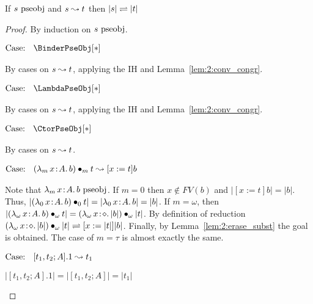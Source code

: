 \begin{lemma}
    \label{lem:2:erase_pseobj_red}
    If $s~\textnormal{pseobj}$ and $s \leadsto t$ then $|s| \rightleftharpoons |t|$
\end{lemma}
\begin{proof}
    By induction on $s~\textnormal{pseobj}$.

    $\text{Case: }\begin{array}{c} \BinderPseObj[*] \end{array}$
    \begin{proofcase}
        By cases on $s \leadsto t$, applying the IH and Lemma~\ref{lem:2:conv_congr}.
    \end{proofcase}

    $\text{Case: }\begin{array}{c} \LambdaPseObj[*] \end{array}$
    \begin{proofcase}
        By cases on $s \leadsto t$, applying the IH and Lemma~\ref{lem:2:conv_congr}.
    \end{proofcase}

    $\text{Case: }\begin{array}{c} \CtorPseObj[*] \end{array}$
    \begin{proofcase}
        By cases on $s \leadsto t$.

        $\text{Case: }\begin{array}{c} ({\lambda_m}\, x\! : \! A.\, b) \bullet_{m} t \leadsto [x := t]b \end{array}$
        \begin{proofcase}
            Note that ${\lambda_m}\, x\! : \! A.\, b~\textnormal{pseobj}$.
            If $m = 0$ then $x \notin FV(b)$ and $|[x := t]b| = |b|$.
            Thus, $|({\lambda_0}\, x\! : \! A.\, b) \bullet_{0} t| = |{\lambda_0}\, x\! : \! A.\, b| = |b|$.
            If $m = \omega$, then $|({\lambda_\omega}\, x\! : \! A.\, b) \bullet_{\omega} t| = ({\lambda_\omega}\, x\! : \! \diamond.\, |b|) \bullet_{\omega} |t|$.
            By definition of reduction $({\lambda_\omega}\, x\! : \! \diamond.\, |b|) \bullet_{\omega} |t| \rightleftharpoons [x := |t|]|b|$.
            Finally, by Lemma~\ref{lem:2:erase_subst} the goal is obtained.
            The case of $m = \tau$ is almost exactly the same.
        \end{proofcase}

        $\text{Case: }\begin{array}{c} [t_1, t_2; A].1 \leadsto t_1 \end{array}$
        \begin{proofcase}
            $|[t_1, t_2; A].1| = |[t_1, t_2; A]| = |t_1|$
        \end{proofcase}


\end{proofcase}
\end{proof}
